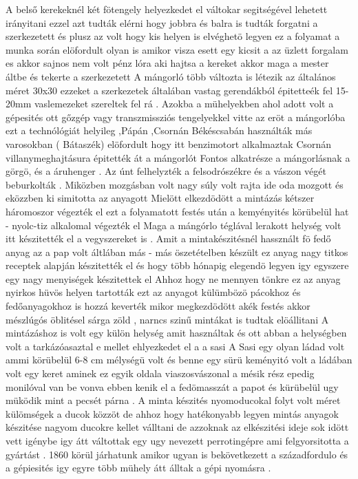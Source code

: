 \documentclass[fontsize=12pt, appendixprefix=true]{scrreprt}
\begin{document}
 A belső kerekeknél két fötengely helyezkedet el váltokar segitségével lehetett irányitani ezzel azt tudták elérni hogy jobbra és balra is tudták forgatni a szerkezetett
 és plusz az volt hogy kis helyen is elvéghetö legyen ez a folyamat a munka során 
 elöfordult olyan is amikor visza esett egy kicsit a az üzlett forgalam es akkor sajnos nem volt pénz lóra aki hajtsa a kereket akkor maga a mester áltbe és tekerte a szerkezetett
 A mángorló több változta is létezik az általános méret 30x30  ezzeket a szerkezetek általában vastag gerendákból épitetteék fel 15-20mm vaslemezeket szereltek fel rá .
 Azokba a mühelyekben ahol adott volt a gépesités ott gőzgép vagy transzmissziós tengelyekkel vitte az eröt a mángorlóba ezt a technólógiát helyileg ,Pápán ,Csornán Békéscsabán használták 
 más varosokban ( Bátaszék) elöfordult  hogy itt benzimotort alkalmaztak Csornán villanymeghajtásura épitették át a mángorlót 
 Fontos alkatrésze a mángorlásnak a görgö, és a áruhenger .
 Az únt felhelyzték a felsodrószékre  és a vászon végét beburkolták .
 Miközben mozgásban volt nagy súly volt rajta ide oda mozgott és eközzben ki simitotta az anyagott 
 Mielött elkezdödött a mintázás kétszer háromoszor végezték el ezt a folyamatott festés után a kemyényités körübelül hat - nyolc-tiz alkalomal végezték el 
 Maga a mángórlo téglával lerakott helység volt itt készitették el a vegyszereket is .
 Amit a mintakészitésnél hassznált fö fedő anyag az a pap volt áltlában más - más öszetételben készült ez anyag nagy titkos receptek alapján készitették el 
 és hogy több hónapig elegendö legyen igy egyszere egy nagy menyiségek készitettek el 
 Ahhoz hogy ne mennyen tönkre ez az anyag nyirkos hüvös helyen tartották 
 ezt az anyagot külümbözö pácokhoz és fedőanyagokhoz is hozzá keverték mikor megkezdödött akék festés akkor mészlúgós öblitésel sárga zöld , narncs szinű mintákat is tudtak elöállitani
 A mintázáshoz is volt egy külön helység amit használtak és ott abban a helységben volt a tarkázóasaztal e mellet ehlyezkedet el a a sasi 
 A Sasi egy olyan ládad volt ammi körübelül 6-8 cm mélységü volt és benne  egy sürü keményitó volt
 a ládában volt egy keret aminek ez egyik oldala viaszosvászonal a mésik rész epedig monilóval van be vonva ebben kenik el a fedömasszát a papot  és kürübelül ugy müködik mint a pecsét párna .
 A minta készités nyomoducokal folyt volt méret külömségek a ducok közzöt de ahhoz hogy hatékonyabb legyen  mintás anyagok készitése nagyom ducokre kellet válltani de azzoknak az elkészitési ideje sok idött vett  igénybe igy átt váltottak egy  ugy nevezett perrotingépre ami felgyorsitotta a gyártást .
 1860 körül járhatunk amikor  ugyan is bekövetkezett a századfordulo és a gépiesités igy egyre több mühely átt álltak a gépi nyomásra .
 
\end{document}
